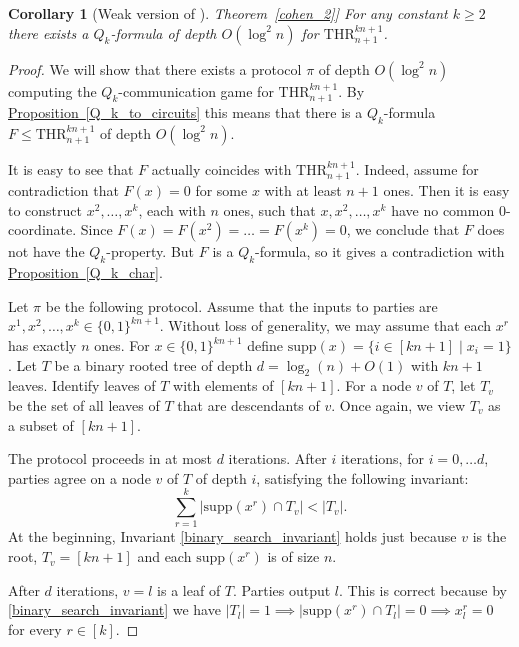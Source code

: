 \documentclass[11pt]{article}
\numberwithin{equation}{section}
\newtheorem{corollary}[theorem]{Corollary}
\theoremstyle{definition}
\theoremstyle{plain}
\newcommand{\expref}[2]{\hyperref[#2]{#1~\ref{#2}}}
\def\THR{\mathrm{THR}}
\begin{document}
\begin{corollary}[Weak version of \expref{Theorem}{cohen_2}]
\label{weak}
For any constant $k \ge 2$ there exists 
%
a $Q_k$-formula of depth $O(\log^2 n)$  %
for $\THR^{kn + 1}_{n + 1}$.
\end{corollary}
\begin{proof}
We will show that there exists 
%
a protocol $\pi$ of depth $O(\log^2 n)$  %
computing the  $Q_k$-communication game for $\THR^{kn + 1}_{n + 1}$. By \expref{Proposition}{Q_k_to_circuits} this means that there is 
%
%
a $Q_k$-formula $F\le \THR^{kn + 1}_{n + 1}$
of depth $O(\log^2 n)$.   %

It is easy to see that $F$ actually coincides with $\THR^{kn + 1}_{n + 1}$. Indeed, assume for contradiction that $F(x) = 0$ for some $x$ with at least $n + 1$ ones. Then it is easy to construct $x^2, \ldots, x^k$, each with $n$ ones, such that $x, x^2, \ldots, x^k$ have no common $0$-coordinate. Since $F(x) = F(x^2) = \ldots = F(x^k) = 0$, we conclude that $F$ does not have the $Q_k$-property. But $F$ is a $Q_k$-formula, so  it gives a contradiction with \expref{Proposition}{Q_k_char}.




Let $\pi$ be the following protocol. Assume that the inputs to parties are $x^1, x^2, \ldots, x^k \in \{0, 1\}^{kn + 1}$. Without loss of generality, we may assume that each $x^r$ has exactly $n$ ones. For $x\in\{0, 1\}^{kn + 1}$ define $\mathrm{supp}(x) = \{i \in [kn + 1] \mid x_i = 1\}$. Let $T$ be a binary rooted tree of depth $d = \log_2(n) + O(1)$ with $kn + 1$ leaves. Identify leaves of $T$ with elements of $[kn + 1]$. For a node $v$ of $T$, let $T_v$ be the set of all leaves of $T$ that are descendants of $v$. Once again, we view $T_v$ as a subset of $[kn + 1]$.

The protocol proceeds in at most $d$ iterations. After $i$ iterations, for $i = 0, \ldots d$, parties agree on a node $v$ of $T$ of depth $i$, satisfying the following invariant:
\begin{equation}
\label{binary_search_invariant}
\sum\limits_{r = 1}^k \left|\mathrm{supp}(x^r) \cap T_v\right| < |T_v|. 
\end{equation}
At the beginning, Invariant \eqref{binary_search_invariant} holds just because $v$ is the root, $T_v = [kn + 1]$ and each $\mathrm{supp}(x^r)$ is of size  $n$. 

After $d$ iterations, $v = l$ is a leaf of $T$. Parties output $l$. This is correct because by \eqref{binary_search_invariant} we have $|T_l| = 1 \implies  |\mathrm{supp}(x^r) \cap T_l| = 0 \implies x_l^r = 0$ for every $r\in [k]$. 


\end{proof}
\end{document}
